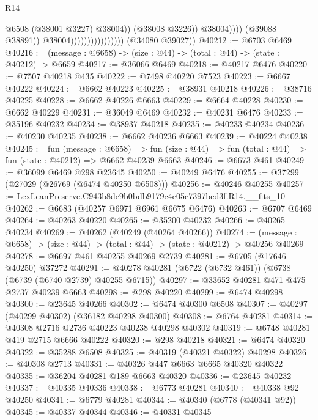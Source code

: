 \begin{lexlean}{R14}
\begin{coremodule}
                                                      @6508
                                                      (@38001 @3227)
                                                      @38004))
                                                  (@38008 @3226))
                                                @38004))))
                                        (@39088 @38891))
                                      @38004))))))))))))))))
      (@34080 @39027))
@40212 := @6703 @6469
@40216 := (message : @6658) -> (size : @44) -> (total : @44) -> (state : @40212) -> @6659
@40217 := @36066 @6469
@40218 := @40217 @6476
@40220 := @7507 @40218 @435
@40222 := @7498 @40220 @7523
@40223 := @6667 @40222
@40224 := @6662 @40223
@40225 := @38931 @40218
@40226 := @38716 @40225
@40228 := @6662 @40226 @6663
@40229 := @6664 @40228
@40230 := @6662 @40229
@40231 := @36049 @6469
@40232 := @40231 @6476
@40233 := @35196 @40232
@40234 := @38937 @40218
@40235 := @40233 @40234
@40236 := @40230 @40235
@40238 := @6662 @40236 @6663
@40239 := @40224 @40238
@40245 := fun (message : @6658) =>
  fun (size : @44) => fun (total : @44) => fun (state : @40212) => @6662 @40239 @6663
@40246 := @6673 @461
@40249 := @36099 @6469 @298 @23645
@40250 := @40249 @6476
@40255 := @37299 (@27029 (@26769 (@6474 @40250 @6508)))
@40256 := @40246 @40255
@40257 := LexLeanPreserve.C943b8de9b0bdb9179c4e05c7397bed3f.R14.__fits_10
@40262 := @6683 (@40257 @6971 @6961 @6675 @6476)
@40263 := @6707 @6469
@40264 := @40263 @40220
@40265 := @35200 @40232
@40266 := @40265 @40234
@40269 := @40262 (@40249 (@40264 @40266))
@40274 := (message : @6658) -> (size : @44) -> (total : @44) -> (state : @40212) -> @40256 @40269
@40278 := @6697 @461 @40255 @40269 @2739
@40281 := @6705 (@17646 @40250) @37272
@40291 := @40278 @40281 (@6722 (@6732 @461)) (@6738 (@6739 (@6740 @2739) @40255 @6715))
@40297 := @33652 @40281 @471 @475 @2737 @40239 @6663
@40298 := @298 @40220
@40299 := @6474 @40298
@40300 := @23645 @40266
@40302 := @6474 @40300 @6508
@40307 := @40297 (@40299 @40302) (@36182 @40298 @40300)
@40308 := @6764 @40281
@40314 := @40308 @2716 @2736 @40223 @40238 @40298 @40302
@40319 := @6748 @40281 @419 @2715 @6666 @40222
@40320 := @298 @40218
@40321 := @6474 @40320
@40322 := @35288 @6508
@40325 := @40319 (@40321 @40322) @40298
@40326 := @40308 @2713
@40331 := @40326 @447 @6663 @6665 @40320 @40322
@40335 := @36204 @40281 @189 @6663 @40320
@40336 := @23645 @40232
@40337 := @40335 @40336
@40338 := @6773 @40281
@40340 := @40338 @92 @40250
@40341 := @6779 @40281
@40344 := @40340 (@6778 (@40341 @92))
@40345 := @40337 @40344
@40346 := @40331 @40345

\end{coremodule}
\end{lexlean}
